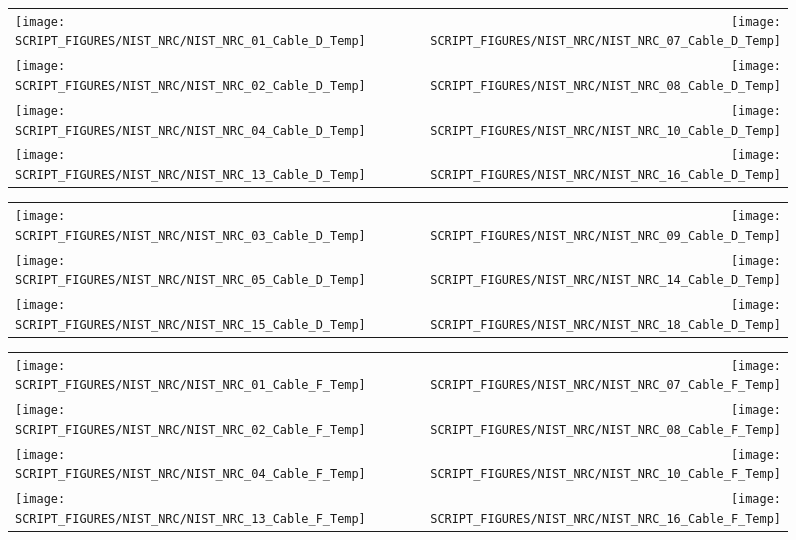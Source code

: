 \begin{figure}[p]
\begin{tabular*}{\textwidth}{l@{\extracolsep{\fill}}r}
\texttt{[image: SCRIPT\_FIGURES/NIST\_NRC/NIST\_NRC\_01\_Cable\_D\_Temp]} &
\texttt{[image: SCRIPT\_FIGURES/NIST\_NRC/NIST\_NRC\_07\_Cable\_D\_Temp]} \\
\texttt{[image: SCRIPT\_FIGURES/NIST\_NRC/NIST\_NRC\_02\_Cable\_D\_Temp]} &
\texttt{[image: SCRIPT\_FIGURES/NIST\_NRC/NIST\_NRC\_08\_Cable\_D\_Temp]} \\
\texttt{[image: SCRIPT\_FIGURES/NIST\_NRC/NIST\_NRC\_04\_Cable\_D\_Temp]} &
\texttt{[image: SCRIPT\_FIGURES/NIST\_NRC/NIST\_NRC\_10\_Cable\_D\_Temp]} \\
\texttt{[image: SCRIPT\_FIGURES/NIST\_NRC/NIST\_NRC\_13\_Cable\_D\_Temp]} &
\texttt{[image: SCRIPT\_FIGURES/NIST\_NRC/NIST\_NRC\_16\_Cable\_D\_Temp]}
\end{tabular*}
\label{NIST_NRC_Cable_D_Closed}
\end{figure}

\begin{figure}[p]
\begin{tabular*}{\textwidth}{l@{\extracolsep{\fill}}r}
\texttt{[image: SCRIPT\_FIGURES/NIST\_NRC/NIST\_NRC\_03\_Cable\_D\_Temp]} &
\texttt{[image: SCRIPT\_FIGURES/NIST\_NRC/NIST\_NRC\_09\_Cable\_D\_Temp]} \\
\texttt{[image: SCRIPT\_FIGURES/NIST\_NRC/NIST\_NRC\_05\_Cable\_D\_Temp]} &
\texttt{[image: SCRIPT\_FIGURES/NIST\_NRC/NIST\_NRC\_14\_Cable\_D\_Temp]} \\
\texttt{[image: SCRIPT\_FIGURES/NIST\_NRC/NIST\_NRC\_15\_Cable\_D\_Temp]} &
\texttt{[image: SCRIPT\_FIGURES/NIST\_NRC/NIST\_NRC\_18\_Cable\_D\_Temp]}
\end{tabular*}
\label{NIST_NRC_Cable_D_Open}
\end{figure}

\begin{figure}[p]
\begin{tabular*}{\textwidth}{l@{\extracolsep{\fill}}r}
\texttt{[image: SCRIPT\_FIGURES/NIST\_NRC/NIST\_NRC\_01\_Cable\_F\_Temp]} &
\texttt{[image: SCRIPT\_FIGURES/NIST\_NRC/NIST\_NRC\_07\_Cable\_F\_Temp]} \\
\texttt{[image: SCRIPT\_FIGURES/NIST\_NRC/NIST\_NRC\_02\_Cable\_F\_Temp]} &
\texttt{[image: SCRIPT\_FIGURES/NIST\_NRC/NIST\_NRC\_08\_Cable\_F\_Temp]} \\
\texttt{[image: SCRIPT\_FIGURES/NIST\_NRC/NIST\_NRC\_04\_Cable\_F\_Temp]} &
\texttt{[image: SCRIPT\_FIGURES/NIST\_NRC/NIST\_NRC\_10\_Cable\_F\_Temp]} \\
\texttt{[image: SCRIPT\_FIGURES/NIST\_NRC/NIST\_NRC\_13\_Cable\_F\_Temp]} &
\texttt{[image: SCRIPT\_FIGURES/NIST\_NRC/NIST\_NRC\_16\_Cable\_F\_Temp]}
\end{tabular*}
\label{NIST_NRC_Cable_F_Closed}
\end{figure}

